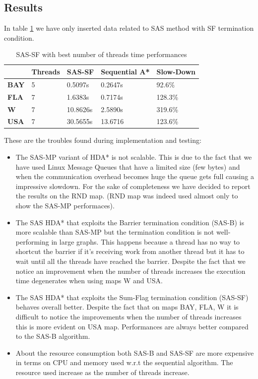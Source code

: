 \documentclass[twocolumn, switch]{article} %
\begin{document}
\subsection{Results}
In table \ref{tablesas} we have only inserted data related to SAS method with SF termination condition.
\begin{table}[ht!]
  \centering
  \caption{SAS-SF with best number of threads time performances}
  \begin{tabular}{|l|l|l|l|l|}
  \hline
  \textbf{}    & \textbf{Threads} & \textbf{SAS-SF} & \textbf{Sequential A*} & \textbf{Slow-Down}\\ \hline
  \textbf{BAY} & 5        & 0.5097s                & 0.2647s  &92.6\%          \\ \hline
  \textbf{FLA} & 7        & 1.6383s                & 0.7174s  & 128.3\%          \\ \hline
  \textbf{W}   & 7        & 10.8626s                & 2.5890s &319.6\%           \\ \hline
  \textbf{USA} & 7         & 30.5655s               & 13.6716 &123.6\%           \\ \hline
  \end{tabular}
  \label{tablesas}
\end{table}
These are the troubles found during implementation and testing:
\begin{itemize}
  \item The SAS-MP variant of HDA* is not scalable. This is due to the fact that we
        have used Linux Message Queues that have a limited size (few bytes) and when
        the communication overhead becomes huge the queue gets full causing a impressive
        slowdown. For the sake of completeness we have decided to report the results on the
        RND map. (RND map was indeed used almost only to show the SAS-MP performaces).
  \item The SAS HDA* that exploits the Barrier termination condition (SAS-B) is more scalable
        than SAS-MP but the termination condition is not well-performing in large graphs. This 
        happens because a thread has no way to shortcut the barrier if it's receiving work from
        another thread but it has to wait until all the threads have reached the barrier. Despite
        the fact that we notice an improvement when the number of threads increases the execution
        time degenerates when using maps W and USA.
  \item The SAS HDA* that exploits the Sum-Flag termination condition (SAS-SF) behaves overall better.
        Despite the fact that on maps BAY, FLA, W it is difficult to notice the improvements when
        the number of threads increases this is more evident on USA map. Performances are always
        better compared to the SAS-B algorithm.
  \item About the resource consumption both SAS-B and SAS-SF are more expensive in terms on CPU and 
        memory used w.r.t the sequential algorithm. The resource used increase as the number of threads
        increase.
\end{itemize}
\end{document}
